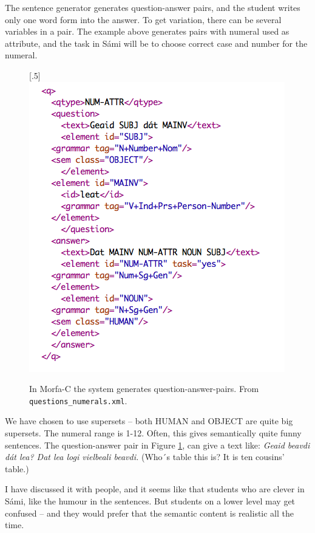 \documentclass[a4paper,12pt]{article}
\begin{document}
\vspace{0.5cm}

The sentence generator generates question-answer pairs, and the student writes only one word form into the answer. To get variation, there can be several variables in a pair. The example above generates pairs with numeral used as attribute, and the task in Sámi will be to choose correct case and number for the numeral. \\  


\begin{figure}[htbp]
\begin{center}
\scalebox{.5}[.5]{\includegraphics{img/morfa_question.png}}\\
\caption{In Morfa-C the system generates question-answer-pairs. From \texttt{questions\_numerals.xml}.}
\label{questionm}
\end{center}
\end{figure}


We have chosen to use supersets -- both HUMAN and OBJECT are quite big supersets. The numeral range is 1-12. Often, this gives semantically quite funny sentences. The question-answer pair in Figure \ref{questionm}, can give a text like: \textit{Geaid beavdi dát lea? Dat lea logi vielbeali beavdi.} (Who´s table this is? It is ten cousins’ table.) 

I have discussed it with people, and it seems like that students who are clever in Sámi, like the humour in the sentences. But students on a lower level may get confused -- and they would prefer that the semantic content is realistic all the time.   
\end{document}
